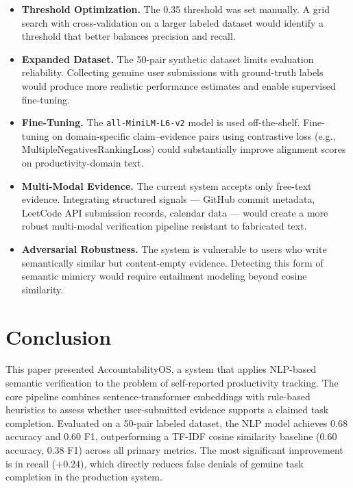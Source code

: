 \documentclass[11pt]{article}
\begin{document}
\begin{itemize}
    \item \textbf{Threshold Optimization.} The 0.35 threshold was set manually. A
    grid search with cross-validation on a larger labeled dataset would identify a
    threshold that better balances precision and recall.

    \item \textbf{Expanded Dataset.} The 50-pair synthetic dataset limits evaluation
    reliability. Collecting genuine user submissions with ground-truth labels would
    produce more realistic performance estimates and enable supervised fine-tuning.

    \item \textbf{Fine-Tuning.} The \texttt{all-MiniLM-L6-v2} model is used
    off-the-shelf. Fine-tuning on domain-specific claim--evidence pairs using
    contrastive loss (e.g., MultipleNegativesRankingLoss) could substantially improve
    alignment scores on productivity-domain text.

    \item \textbf{Multi-Modal Evidence.} The current system accepts only free-text
    evidence. Integrating structured signals --- GitHub commit metadata, LeetCode API
    submission records, calendar data --- would create a more robust multi-modal
    verification pipeline resistant to fabricated text.

    \item \textbf{Adversarial Robustness.} The system is vulnerable to users who write
    semantically similar but content-empty evidence. Detecting this form of semantic
    mimicry would require entailment modeling beyond cosine similarity.
\end{itemize}

\section{Conclusion}

This paper presented AccountabilityOS, a system that applies NLP-based semantic
verification to the problem of self-reported productivity tracking. The core pipeline
combines sentence-transformer embeddings with rule-based heuristics to assess whether
user-submitted evidence supports a claimed task completion. Evaluated on a 50-pair
labeled dataset, the NLP model achieves 0.68 accuracy and 0.60 F1, outperforming a
TF-IDF cosine similarity baseline (0.60 accuracy, 0.38 F1) across all primary metrics.
The most significant improvement is in recall ($+0.24$), which directly reduces false
denials of genuine task completion in the production system.
\end{document}
